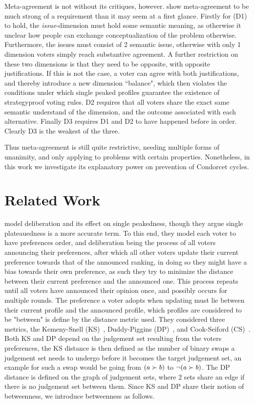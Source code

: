 Meta-agreement is not without its critiques, however. \citet{ottonelliElusiveNotionMetaagreement2013} show meta-agreement to be much strong of a requirement than it may seem at a first glance. Firstly for (D1) to hold, the \textit{issue}-dimension must hold some semantic meaning, as otherwise it unclear how people can exchange conceptualization of the problem otherwise. Furthermore, the issues must consist of 2 semantic issue, otherwise with only 1 dimension voters simply reach substantive agreement. A further restriction on these two dimensions is that they need to be opposite, with opposite justifications. If this is not the case, a voter can agree with both justifications, and thereby introduce a new dimension ``balance", which then violates the conditions under which single peaked profiles guarantee the existence of strategyproof voting rules. D2 requires that all voters share the exact same semantic understand of the dimension, and the outcome associated with each alternative. Finally D3 requires D1 and D2 to have happened before in order. Clearly D3 is the weakest of the three.

Thus meta-agreement is still quite restrictive, needing multiple forms of unanimity, and only applying to problems with certain properties. Nonetheless, in this work we investigate its explanatory power on prevention of Condorcet cycles.

\section{Related Work}
\citet{radDeliberationSinglePeakednessCoherent2021a} model deliberation and its effect on single peakedness, though they argue single plateauedness is a more accurate term. To this end, they model each voter to have preferences order, and deliberation being the process of all voters announcing their preferences, after which all other voters update their current preference towards that of the announced ranking, in doing so they might have a bias towards their own preference, as such they try to minimize the distance between their current preference and the announced one. This process repeats until all voters have announced their opinion once, and possibly occurs for multiple rounds. The preference a voter adopts when updating must lie between their current profile and the announced profile, which profiles are considered to be "between" is define by the distance metric used. They considered three metrics, the Kemeny-Snell (KS)~\citep{kemeny1962preference}, Duddy-Piggins (DP)~\citep{duddyMeasureDistanceJudgment2012a}, and Cook-Seiford (CS)~\citep{cookPriorityRankingConsensus1978}. Both KS and DP depend on the judgement set resulting from the voters preferences, the KS distance is then defined as the number of binary swaps a judgement set needs to undergo before it becomes the target judgement set, an example for such a swap would be going from $(a \succ b)$ to $\neg (a \succ b)$. The DP distance is defined on the graph of judgement sets, where 2 sets share an edge if there is no judgement set between them. Since KS and DP share their notion of betweenness, we introduce betweenness as follows.

